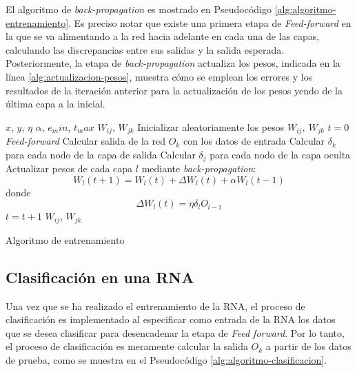 \documentclass[journal]{IEEEtran}
\begin{document}
El algoritmo de \emph{back-propagation} es mostrado en Pseudocódigo \ref{alg:algoritmo-entrenamiento}.
Es preciso notar que existe una primera etapa de \emph{Feed-forward} en la que se va alimentando a la red hacia adelante en cada una de las capas, calculando las discrepancias entre sus salidas y la salida esperada.
Posteriormente, la etapa de \emph{back-propagation} actualiza los pesos, indicada en la línea \ref{alg:actualizacion-pesos}, muestra cómo se emplean los errores y los resultados de la iteración anterior para la actualización de los pesos yendo de la última capa a la inicial.

\begin{algorithm} 
\footnotesize
\begin{algorithmic}[1] 
\REQUIRE  $x$, $y$, $\eta$ $\alpha$, $e_min$, $t_max$
\ENSURE $W_{ij}$, $W_{jk}$
\STATE Inicializar aleatoriamente los pesos $W_{ij},~W_{jk}$
\STATE $t=0$
\REPEAT
\STATE \emph{Feed-forward} Calcular salida de la red $O_k$ con los datos de entrada
\STATE Calcular $\delta _k$ para cada nodo de la capa de salida
\STATE Calcular $\delta _j$ para cada nodo de la capa oculta
\STATE Actualizar pesos de cada capa $l$ mediante \emph{back-propagation}:
$$W_l(t+1) = W_l(t)+\Delta W_l(t) + \alpha W_l (t-1)$$ \label{alg:actualizacion-pesos}
donde $$\Delta W_l (t) = \eta \delta _l O_{l-1}$$
\STATE $t = t + 1$
\RETURN $W_{ij}$, $W_{jk}$
\end{algorithmic} 
\caption{Algoritmo de entrenamiento} 
\label{alg:algoritmo-entrenamiento}
\end{algorithm}


\subsection{Clasificación en una RNA} %
\label{sub:clasificaci_n_en_una_rna}
Una vez que se ha realizado el entrenamiento de la RNA, el proceso de clasificación es implementado al especificar como entrada de la RNA los datos que se desea clasificar para desencadenar la etapa de \emph{Feed forward}.
Por lo tanto, el proceso de clasificación es meramente calcular la salida $O_k$ a partir de los datos de prueba, como se muestra en el Pseudocódigo \ref{alg:algoritmo-clasificacion}.
\end{document}

